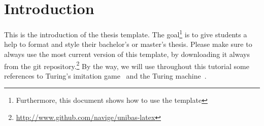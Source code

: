 \chapter{Introduction}

This is the introduction of the thesis template. The goal\footnote{Furthermore, this document shows how to use the template} is to give students a help to format and style their bachelor's or master's thesis. Please make sure to always use the most current version of this template, by downloading it always from the git repository.\footnote{\url{http://www.github.com/navige/unibas-latex}} By the way, we will use throughout this tutorial some references to Turing's imitation game~\cite{turing:1950} and the Turing machine~\cite{turing:1936}.

